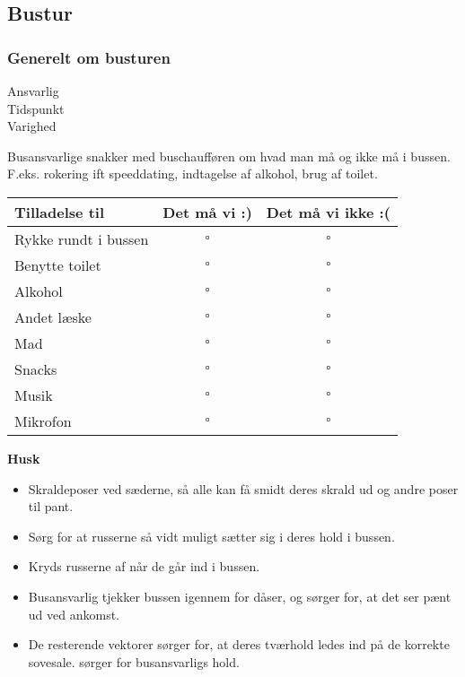 \documentclass[../../../main.tex]{subfiles}
\begin{document}
\subsection{Bustur}

\subsubsection{Generelt om busturen}

\begin{description}
\item[Ansvarlig] \placeholder
\item[Tidspunkt] \placeholder
\item[Varighed] \placeholder
\end{description}

Busansvarlige snakker med buschaufføren om hvad man må og ikke må i bussen. F.eks. rokering ift speeddating, indtagelse af alkohol, brug af toilet.

\begin{table}[ht!]
\begin{center}
\begin{tabular}{|l|c|c|}
\hline
Tilladelse til          & \textbf{Det må vi :)} & \textbf{Det må vi ikke :(}\\ \hline
Rykke rundt i bussen    & $\square$             &  $\square$                \\ \hline
Benytte toilet          & $\square$             &  $\square$                \\ \hline
Alkohol                 & $\square$             &  $\square$                \\ \hline
Andet læske             & $\square$             &  $\square$                \\ \hline
Mad                     & $\square$             &  $\square$                \\ \hline
Snacks                  & $\square$             &  $\square$                \\ \hline
Musik                   & $\square$             &  $\square$                \\ \hline
Mikrofon                & $\square$             &  $\square$                \\ \hline
\end{tabular}
\end{center}
\end{table}

\textbf{Husk}
\begin{itemize}
    \item Skraldeposer ved sæderne, så alle kan få smidt deres skrald ud og andre poser til pant.
    \item Sørg for at russerne så vidt muligt sætter sig i deres hold i bussen.
    \item Kryds russerne af når de går ind i bussen.
    \item Busansvarlig tjekker bussen igennem for dåser, og sørger for, at det ser pænt ud ved ankomst.
    \item De resterende vektorer sørger for, at deres tværhold ledes ind på de korrekte sovesale. \VEKTOREKS sørger for busansvarligs hold.
\end{itemize}
\end{document}
